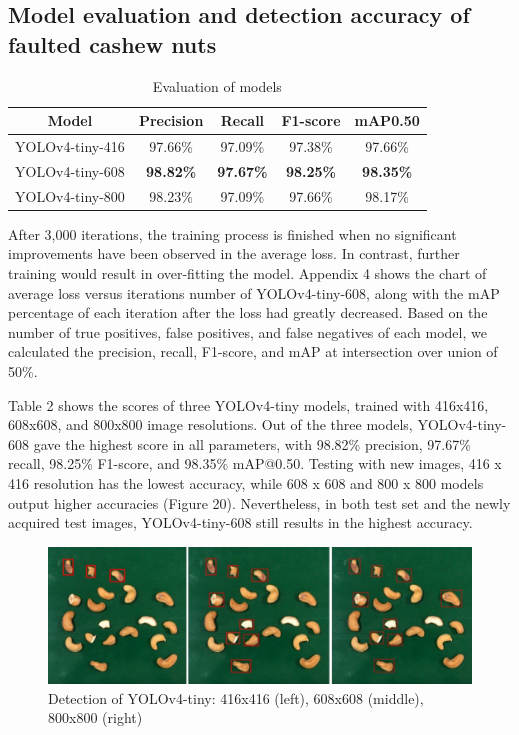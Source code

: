 \documentclass[10pt, letterpaper]{article}
\begin{document}
\subsection{Model evaluation and detection accuracy of faulted cashew nuts}
    \begin{table}[h!]
        \centering
        \renewcommand{\arraystretch}{1.5}
        \setlength{\tabcolsep}{11pt}
        \caption{Evaluation of models}\label{table2}
        \begin{tabular}{ccccc}
            \hline 
            Model & Precision & Recall & F1-score & mAP\@0.50 \\ 
            \hline 
            YOLOv4-tiny-416 & 97.66\% & 97.09\% & 97.38\% & 97.66\%\\
            YOLOv4-tiny-608 & \textbf{98.82\%} & \textbf{97.67\%} & \textbf{98.25\%} & \textbf{98.35\%}\\ 
            YOLOv4-tiny-800 & 98.23\% & 97.09\% & 97.66\% & 98.17\%\\
            \hline
        \end{tabular}
    \end{table}
    After 3,000 iterations, the training process is finished when no significant improvements have been observed in the average loss. In contrast, further training would result in over-fitting the model. Appendix 4 shows the chart of average loss versus iterations number of YOLOv4-tiny-608, along with the mAP percentage of each iteration after the loss had greatly decreased. Based on the number of true positives, false positives, and false negatives of each model, we calculated the precision, recall, F1-score, and mAP at intersection over union of 50\%.\par 
    Table 2 shows the scores of three YOLOv4-tiny models, trained with 416x416, 608x608, and 800x800 image resolutions. Out of the three models, YOLOv4-tiny-608 gave the highest score in all parameters, with 98.82\% precision, 97.67\% recall, 98.25\% F1-score, and 98.35\% mAP@0.50. Testing with new images, 416 x 416 resolution has the lowest accuracy, while 608 x 608 and 800 x 800 models output higher accuracies (Figure 20). Nevertheless, in both test set and the newly acquired test images, YOLOv4-tiny-608 still results in the highest accuracy.\par
    \begin{figure}[h]
        \centering
        \includegraphics[width=\textwidth]{fig21.JPG}
        \caption{Detection of YOLOv4-tiny: 416x416 (left), 608x608 (middle), 800x800 (right)}
    \end{figure}
\end{document}
